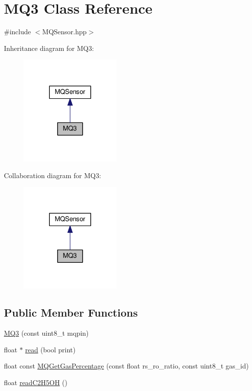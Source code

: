 \hypertarget{class_m_q3}{}\section{M\+Q3 Class Reference}
\label{class_m_q3}


{\ttfamily \#include $<$M\+Q\+Sensor.\+hpp$>$}



Inheritance diagram for M\+Q3\+:\nopagebreak
\begin{figure}[H]
\begin{center}
\leavevmode
\includegraphics[width=143pt]{class_m_q3__inherit__graph}
\end{center}
\end{figure}


Collaboration diagram for M\+Q3\+:\nopagebreak
\begin{figure}[H]
\begin{center}
\leavevmode
\includegraphics[width=143pt]{class_m_q3__coll__graph}
\end{center}
\end{figure}
\subsection*{Public Member Functions}
\begin{DoxyCompactItemize}
\item 
\hyperlink{class_m_q3_a6d7d7060e08b946cbb85a5938064d0ae}{M\+Q3} (const uint8\+\_\+t mqpin)
\item 
float $\ast$ \hyperlink{class_m_q3_a255ec0e64ea27c082f5d448d521a1303}{read} (bool print)
\item 
float const \hyperlink{class_m_q3_abadddbaa140943a12375741adbce67fe}{M\+Q\+Get\+Gas\+Percentage} (const float rs\+\_\+ro\+\_\+ratio, const uint8\+\_\+t gas\+\_\+id)
\item 
float \hyperlink{class_m_q3_ab186b1fdf6217d4a175c88c26422138a}{read\+C2\+H5\+OH} ()
\end{DoxyCompactItemize}
